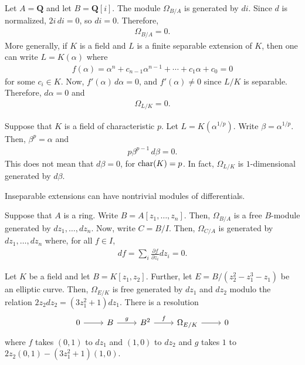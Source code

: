 \documentclass [11 pt, oneside] {article}
\begin{document}
\begin{example}[ ]\label{}\text{}
Let $A=\mathbf{Q}$ and let $B= \mathbf{Q}[i]$.
The module $\Omega_{B/A}$ is generated by $di$. Since $d$ is normalized, $2i\,di=0$, so $di=0$. Therefore,
\begin{align*}
	\Omega_{B/A} = 0.
\end{align*}
More generally, if $K$ is a field and $L$ is a finite separable extension of $K$, then one can write $L=K(\alpha)$ where
\begin{align*}
	f(\alpha) = \alpha^n + c_{n-1}\alpha^{n-1}+\cdots + c_1\alpha + c_0=0
\end{align*}
for some $c_i\in K$. Now, $f'(\alpha)\,d\alpha=0$, and $f'(\alpha)\ne 0$ since $L/K$ is separable. Therefore, $d\alpha =0$ and 
\begin{align*}
	\Omega_{L/K} = 0.
\end{align*}
\end{example}

\begin{example}[ ]\label{}\text{}
Suppose that $K$ is a field of characteristic $p$. Let $L = K(\alpha^{1/p})$. Write $\beta = \alpha^{1/p}$.
Then, $\beta^p=\alpha$ and 
\begin{align*}
	p\beta^{p-1}\,d\beta = 0.
\end{align*}
This does not mean that $d\beta =0$, for $\operatorname{char}(K) = p$. In fact, $\Omega_{L/K}$ is $1$-dimensional generated by $d\beta$.

Inseparable extensions can have nontrivial modules of differentials.
\end{example}

Suppose that $A$ is a ring. Write $B = A[z_1,\hdots, z_n]$. Then, $\Omega_{B/A}$ is a free $B$-module generated by $dz_1,\hdots, dz_n$.
Now, write $C=B/I$. Then, $\Omega_{C/A}$ is generated by $dz_1,\hdots, dz_n$ where, for all $f\in I$,
\begin{align*}
	df = \sum_{i}^{} \frac{\partial f}{\partial z_i}dz_i =0.
\end{align*}

\begin{example}[ ]\label{}\text{}
Let $K$ be a field and let $B=K[z_1,z_2]$. Further, let $E=B/(z_2^2-z_1^3-z_1)$ be an elliptic curve.
Then, $\Omega_{E/K}$ is free generated by $dz_1$ and $dz_2$ modulo the relation $2z_2dz_2 =(3z_1^2 + 1)dz_1$.
There is a resolution
\[
\begin{tikzcd}
	0\ar[r] & B\ar[r,"g"]&B^2 \ar[r,"f"] &\Omega_{E/K} \ar[r]&0
\end{tikzcd}
\]
where $f$ takes $(0,1)$ to $dz_1$ and $(1,0)$ to $dz_2$ and $g$ takes $1$ to $2z_2(0,1) -  (3z_1^2 + 1) (1,0)$.
\end{example}
\end{document}

